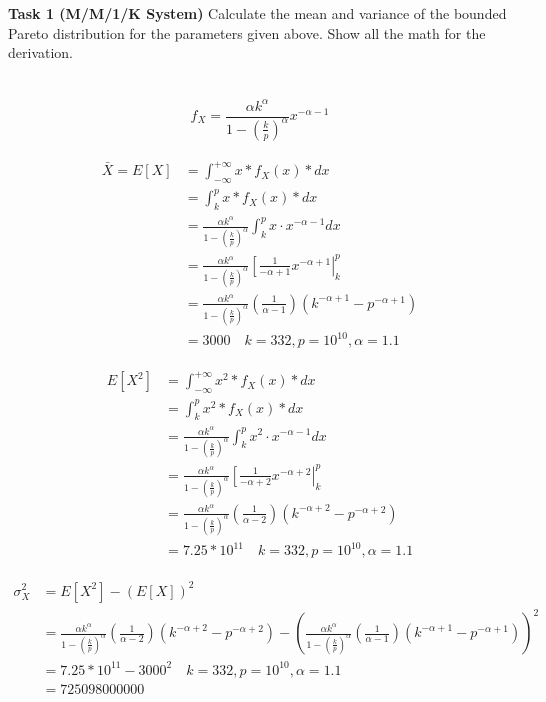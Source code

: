 \documentclass{article}
\begin{document}

\bigskip

\textbf{Task 1 (M/M/1/K System)}
Calculate the mean and variance of the bounded Pareto distribution for the parameters given
above. Show all the math for the derivation.
\\
\medskip\\\texttt{
$$
f_X = \frac{\alpha k^\alpha}{1-\left(\frac{k}{p}\right)^\alpha}x^{-\alpha-1}
$$
$$
\begin{aligned}
\bar{X} = E[X] &= \int_{-\infty}^{+\infty}x*f_X(x)*dx
\\
& = \int_k^p x*f_X(x)*dx
\\
& = \frac{\alpha k^\alpha}{1-\left(\frac{k}{p}\right)^\alpha} \int_k^p x \cdot x^{-\alpha-1}dx
\\
& = \frac{\alpha k^\alpha}{1-\left(\frac{k}{p}\right)^\alpha} \left[\frac{1}{-\alpha+1}x^{-\alpha+1}\right|_k^p
\\
& = \frac{\alpha k^\alpha}{1-\left(\frac{k}{p}\right)^\alpha} \left(\frac{1}{\alpha-1}\right) \left(k^{-\alpha+1}-p^{-\alpha+1}\right)
\\
& = 3000 \quad k=332, p=10^{10}, \alpha =1.1
\end{aligned}
$$
$$
\begin{aligned}
E[X^2] &= \int_{-\infty}^{+\infty}x^2*f_X(x)*dx
\\
& = \int_k^p x^2*f_X(x)*dx
\\
& = \frac{\alpha k^\alpha}{1-\left(\frac{k}{p}\right)^\alpha} \int_k^p x^2 \cdot x^{-\alpha-1}dx
\\
& = \frac{\alpha k^\alpha}{1-\left(\frac{k}{p}\right)^\alpha} \left[\frac{1}{-\alpha+2}x^{-\alpha+2}\right|_k^p
\\
& = \frac{\alpha k^\alpha}{1-\left(\frac{k}{p}\right)^\alpha} \left(\frac{1}{\alpha-2}\right) \left(k^{-\alpha+2}-p^{-\alpha+2}\right)
\\
& = 7.25*10^{11} \quad k=332, p=10^{10}, \alpha =1.1
\end{aligned}
$$
$$
\begin{aligned}
\sigma_X^2 &=  E[X^2] - (E[X])^2  \\
& =  \frac{\alpha k^\alpha}{1-\left(\frac{k}{p}\right)^\alpha} \left(\frac{1}{\alpha-2}\right) \left(k^{-\alpha+2}-p^{-\alpha+2}\right) - \left(  \frac{\alpha k^\alpha}{1-\left(\frac{k}{p}\right)^\alpha} \left(\frac{1}{\alpha-1}\right) \left(k^{-\alpha+1}-p^{-\alpha+1}\right) \right)^2 \\
& = 7.25*10^{11} - 3000^2  \quad k=332, p=10^{10}, \alpha =1.1 \\
& = 725098000000
\end{aligned}
$$
}
\end{document}
